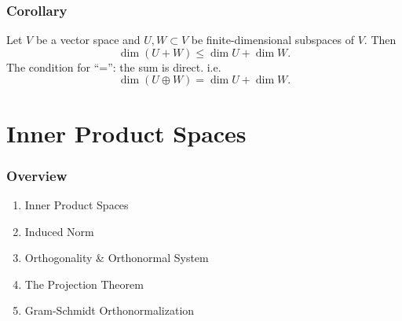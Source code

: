 \documentclass[12pt, t]{beamer}
\begin{document}
\begin{frame}
    \frametitle{Corollary}
    Let $V$ be a vector space and $U,W\subset V$ be finite-dimensional subspaces of $V$. Then
    \[\dim(U+W)\leq\dim U+\dim W.\]
    The condition for ``='': the sum is direct. i.e.
    \[\dim(U\oplus W)=\dim U+\dim W.\]
\end{frame}

\section{Inner Product Spaces}
\begin{frame}
    \frametitle{Overview}
    \begin{enumerate}
        \item Inner Product Spaces
        \item Induced Norm
        \item Orthogonality \& Orthonormal System
        \item The Projection Theorem
        \item Gram-Schmidt Orthonormalization
    \end{enumerate}

\end{frame}
\end{document}
